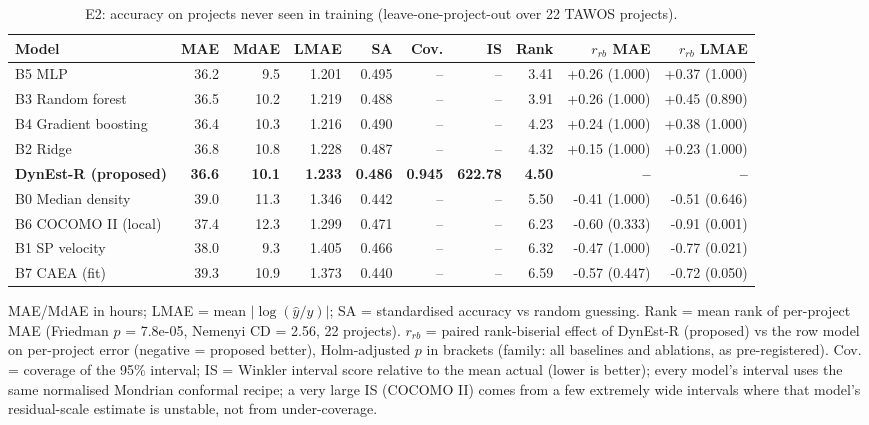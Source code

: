 \begin{table}[t]
\centering
\scriptsize
\caption{E2: accuracy on projects never seen in training (leave-one-project-out over 22 TAWOS projects).}
\label{tab:e2}
\begin{tabular}{lrrrrrrrrr}
\toprule
Model & MAE & MdAE & LMAE & SA & Cov. & IS & Rank & $r_{rb}$ MAE & $r_{rb}$ LMAE \\
\midrule
B5 MLP & 36.2 & 9.5 & 1.201 & 0.495 & -- & -- & 3.41 & +0.26 (1.000) & +0.37 (1.000) \\
B3 Random forest & 36.5 & 10.2 & 1.219 & 0.488 & -- & -- & 3.91 & +0.26 (1.000) & +0.45 (0.890) \\
B4 Gradient boosting & 36.4 & 10.3 & 1.216 & 0.490 & -- & -- & 4.23 & +0.24 (1.000) & +0.38 (1.000) \\
B2 Ridge & 36.8 & 10.8 & 1.228 & 0.487 & -- & -- & 4.32 & +0.15 (1.000) & +0.23 (1.000) \\
\textbf{DynEst-R (proposed)} & \textbf{36.6} & \textbf{10.1} & \textbf{1.233} & \textbf{0.486} & \textbf{0.945} & \textbf{622.78} & \textbf{4.50} & \textbf{--} & \textbf{--} \\
B0 Median density & 39.0 & 11.3 & 1.346 & 0.442 & -- & -- & 5.50 & -0.41 (1.000) & -0.51 (0.646) \\
B6 COCOMO II (local) & 37.4 & 12.3 & 1.299 & 0.471 & -- & -- & 6.23 & -0.60 (0.333) & -0.91 (0.001) \\
B1 SP velocity & 38.0 & 9.3 & 1.405 & 0.466 & -- & -- & 6.32 & -0.47 (1.000) & -0.77 (0.021) \\
B7 CAEA (fit) & 39.3 & 10.9 & 1.373 & 0.440 & -- & -- & 6.59 & -0.57 (0.447) & -0.72 (0.050) \\
\bottomrule
\end{tabular}
\par\smallskip\parbox{0.95\linewidth}{\footnotesize MAE/MdAE in hours; LMAE = mean $|\log(\hat y/y)|$; SA = standardised accuracy vs random guessing. Rank = mean rank of per-project MAE (Friedman $p$ = 7.8e-05, Nemenyi CD = 2.56, 22 projects). $r_{rb}$ = paired rank-biserial effect of DynEst-R (proposed) vs the row model on per-project error (negative = proposed better), Holm-adjusted $p$ in brackets (family: all baselines and ablations, as pre-registered). Cov. = coverage of the 95\% interval; IS = Winkler interval score relative to the mean actual (lower is better); every model's interval uses the same normalised Mondrian conformal recipe; a very large IS (COCOMO II) comes from a few extremely wide intervals where that model's residual-scale estimate is unstable, not from under-coverage. }
\end{table}
